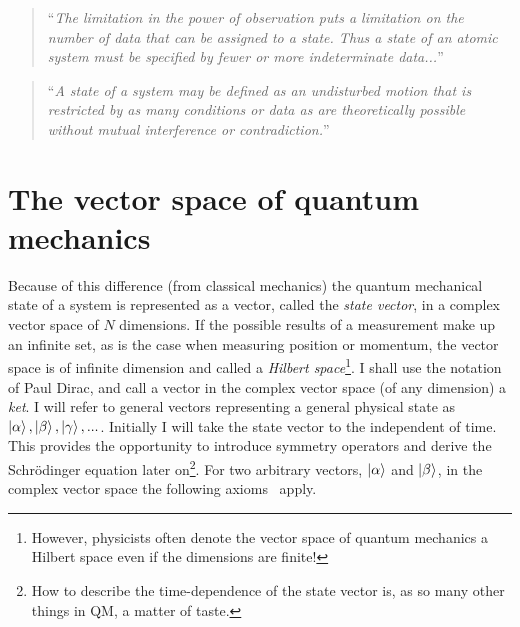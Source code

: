 \begin{quote}
	“\textit{The limitation in the power of observation puts a limitation on the number of data that can be assigned to a state. Thus a state of an atomic system must be specified by fewer or more indeterminate data...}”
\end{quote} 
\begin{quote}
	“\textit{A state of a system may be defined as an undisturbed motion that is restricted by as many conditions or data as are theoretically possible without mutual interference or contradiction.}”
\end{quote} 

\section{The vector space of quantum mechanics}
Because of this difference (from classical mechanics) the quantum mechanical state of a system is represented as a vector, called the \emph{state vector}, in a complex vector space of $N$ dimensions. If the possible results of a measurement make up an infinite set, as is the case when measuring position or momentum, the vector space is of infinite dimension and called a \emph{Hilbert space}\footnote{However, physicists often denote the vector space of quantum mechanics a Hilbert space even if the dimensions are finite!}. I shall use the notation of Paul Dirac, and call a vector in the complex vector space (of any dimension) a \emph{ket}. I will refer to general vectors representing a general physical state as $\ket{\alpha},\ket{\beta}, \ket{\gamma},...$. Initially I will take the state vector to the independent of time. This provides the opportunity to introduce symmetry operators and derive the Schrödinger equation later on\footnote{How to describe the time-dependence of the state vector is, as so many other things in QM, a matter of taste.}. For two arbitrary vectors, $\ket{\alpha}$ and $\ket{\beta}$, in the complex vector space the following axioms ~apply\citep{Sakurai}.

